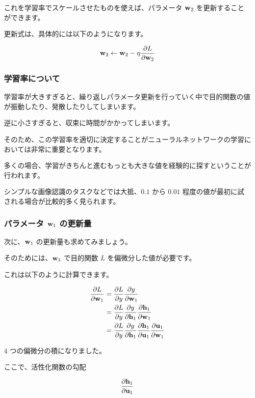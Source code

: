 これを学習率でスケールさせたものを使えば、パラメータ ${\bf w}_2$ を更新することができます。

更新式は、具体的には以下のようになります。


\[
{\bf w}_2 \leftarrow {\bf w}_2 - \eta \frac{\partial L}{\partial {\bf w}_2}
\]


\subsubsection{学習率について}


学習率が大きすぎると、繰り返しパラメータ更新を行っていく中で目的関数の値が振動したり、発散したりしてしまいます。

逆に小さすぎると、収束に時間がかかってしまいます。

そのため、この学習率を適切に決定することがニューラルネットワークの学習においては非常に重要となります。

多くの場合、学習がきちんと進むもっとも大きな値を経験的に探すということが行われます。

シンプルな画像認識のタスクなどでは大抵、$0.1$ から $0.01$ 程度の値が最初に試される場合が比較的多く見られます。


\subsubsection{パラメータ ${\bf w}_1$ の更新量}


次に、${\bf w}_1$ の更新量も求めてみましょう。

そのためには、${\bf w}_1$ で目的関数 $L$ を偏微分した値が必要です。

これは以下のように計算できます。


\[
\begin{aligned}
\frac{\partial L}{\partial {\bf w}_1}
&= \frac{\partial L}{\partial y} \frac{\partial y}{\partial {\bf w}_1} \\
&=
\frac{\partial L}{\partial y}
\frac{\partial y}{\partial {\bf h}_1}
\frac{\partial {\bf h}_1}{\partial {\bf w}_1} \\
&=
\frac{\partial L}{\partial y}
\frac{\partial y}{\partial {\bf h}_1}
\frac{\partial {\bf h}_1}{\partial {\bf u}_1}
\frac{\partial {\bf u}_1}{\partial {\bf w}_1}
\end{aligned}
\]


4 つの偏微分の積になりました。

ここで、活性化関数の勾配


\[
\frac{\partial {\bf h}_1}{\partial {\bf u}_1}
\]


